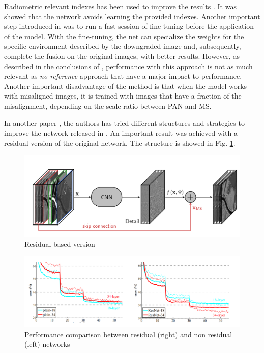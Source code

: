 \documentclass[12pt]{report}
\begin{document}
Radiometric relevant indexes has been used to improve the results \cite{pnn}. 
It was showed that the network avoids learning the provided indexes.
Another important step introduced in \cite{pnn2} was to run a fast session of fine-tuning before the 
application of the model.
With the fine-tuning, the net can specialize the weights for the specific environment described by the downgraded image
and, subsequently, complete the fusion on the original images, with better results.
However, as described in the conclusions of \cite{pnn2}, performance with this approach is
not as much relevant as \textit{no-reference} approach that have a major impact to performance.
Another important disadvantage of the method is that when the model works with misaligned images, 
it is trained with images that have a fraction of the misalignment, depending on the scale ratio between PAN and MS. 

In another paper \cite{residualpnn}, the authors has tried different structures and strategies to improve the network released in \cite{pnn}.
An important result was achieved with a residual version of the original network.
The structure is showed in Fig. \ref{fig:residual-architecture}.

\begin{figure}[t]
    \centering
    \includegraphics[scale=.35]{residualpnn-architecture.png}
    \caption{Residual-based version \cite{residualpnn}}
    \label{fig:residual-architecture}
\end{figure}

\begin{figure}[t]
    \centering
    \includegraphics[scale=.35]{residual_comparison.png}
    \caption{Performance comparison between residual (right) and non residual (left) networks \cite{residual4}}
    \label{fig:residual-comparison}
\end{figure}
\end{document}
